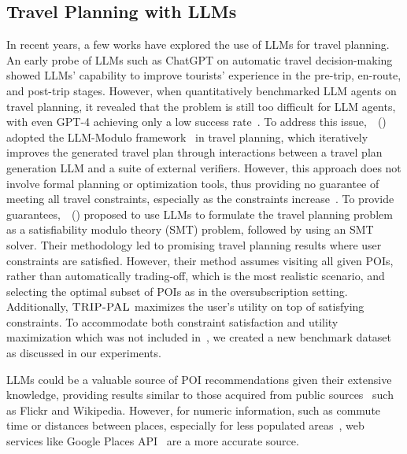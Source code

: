 \documentclass[letterpaper]{article}
\newcommand{\gpt}{{\sc GPT-4}\xspace}
\newcommand{\approach}{\ensuremath{\textsc{TRIP-PAL}}\xspace}
\begin{document}
\subsection{Travel Planning with LLMs}
In recent years, a few works have explored the use of LLMs for travel planning. An early probe of LLMs such as ChatGPT on automatic travel decision-making~\cite{GPT_travel_plan_wong2023autonomous} showed LLMs' capability to improve tourists' experience in the pre-trip, en-route, and post-trip stages. However, when quantitatively benchmarked LLM agents on travel planning, it revealed that the problem is still too difficult for LLM agents, with even \gpt achieving only a low success rate~\cite{xie2024travelplanner}. To address this issue,~\citeauthor{gundawar2024robust}~(\citeyear{gundawar2024robust}) adopted the LLM-Modulo framework~\cite{kambhampati2024can} in travel planning, which iteratively improves the generated travel plan through interactions between a travel plan generation LLM and a suite of external verifiers. However, this approach does not involve formal planning or optimization tools, thus providing no guarantee of meeting all travel constraints, especially as the constraints increase~\cite{zheng2024natural}. To provide guarantees,~\citeauthor{hao2024large}~(\citeyear{hao2024large}) proposed to use LLMs to formulate the travel planning problem as a satisfiability modulo theory (SMT) problem, followed by using an SMT solver. Their methodology led to promising travel planning results where user constraints are satisfied. However, their method assumes visiting all given POIs, rather than automatically trading-off, which is the most realistic scenario, and selecting the optimal subset of POIs as in the oversubscription setting. Additionally, \approach maximizes the user's utility on top of satisfying constraints. To accommodate both constraint satisfaction and utility maximization which was not included in~\cite{xie2024travelplanner}, we created a new benchmark dataset as discussed in our experiments.

LLMs could be a valuable source of POI recommendations given their extensive knowledge, providing results similar to those acquired from public sources~\cite{DBLP:journals/ipm/BrilhanteMNPR15, majid2014system} such as Flickr and Wikipedia. However, for numeric information, such as commute time or distances between places, especially for less populated areas~\cite{roberts2023gpt4geo}, web services like Google Places API~\cite{google_places_api} are a more accurate source. 
\end{document}
